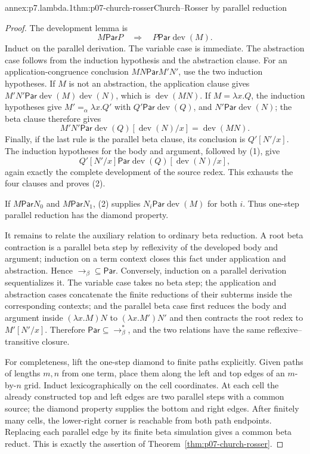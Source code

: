 \begin{annexitem}{annex:p7.lambda.1}{thm:p07-church-rosser}{Church--Rosser by parallel reduction}
\begin{proof}
The development lemma is
\[
 M\mathrel{\mathsf{Par}}P
 \quad\Longrightarrow\quad
 P\mathrel{\mathsf{Par}}\operatorname{dev}(M).          \tag{2}
\]
Induct on the parallel derivation.  The variable case is immediate.  The
abstraction case follows from the induction hypothesis and the abstraction
clause.  For an application-congruence conclusion
\(MN\mathrel{\mathsf{Par}}M'N'\), use the two induction hypotheses.  If
\(M\) is not an abstraction, the application clause gives
\(M'N'\mathrel{\mathsf{Par}}
  \operatorname{dev}(M)\operatorname{dev}(N)\), which is
\(\operatorname{dev}(MN)\).  If \(M=\lambda x.Q\), the induction hypotheses
give
\(M'=_{\alpha}\lambda x.Q'\) with
\(Q'\mathrel{\mathsf{Par}}\operatorname{dev}(Q)\), and
\(N'\mathrel{\mathsf{Par}}\operatorname{dev}(N)\); the beta clause therefore
gives
\[
 M'N'\mathrel{\mathsf{Par}}
 \operatorname{dev}(Q)[\operatorname{dev}(N)/x]
 =\operatorname{dev}(MN).
\]
Finally, if the last rule is the parallel beta clause, its conclusion is
\(Q'[N'/x]\).  The induction hypotheses for the body and argument, followed
by (1), give
\[
 Q'[N'/x]\mathrel{\mathsf{Par}}
 \operatorname{dev}(Q)[\operatorname{dev}(N)/x],
\]
again exactly the complete development of the source redex.  This exhausts
the four clauses and proves (2).

If
\(M\mathrel{\mathsf{Par}}N_0\) and
\(M\mathrel{\mathsf{Par}}N_1\), (2) supplies
\(N_i\mathrel{\mathsf{Par}}\operatorname{dev}(M)\) for both \(i\).
Thus one-step parallel reduction has the diamond property.

It remains to relate the auxiliary relation to ordinary beta reduction.  A
root beta contraction is a parallel beta step by reflexivity of the developed
body and argument; induction on a term context closes this fact under
application and abstraction.  Hence
\(\longrightarrow_\beta\subseteq\mathsf{Par}\).  Conversely, induction on a
parallel derivation sequentializes it.  The variable case takes no beta step;
the application and abstraction cases concatenate the finite reductions of
their subterms inside the corresponding contexts; and the parallel beta case
first reduces the body and argument inside
\((\lambda x.M)N\) to \((\lambda x.M')N'\) and then contracts the root redex
to \(M'[N'/x]\).  Therefore
\(\mathsf{Par}\subseteq\longrightarrow_\beta^{*}\), and the two relations
have the same reflexive--transitive closure.

For completeness, lift the one-step diamond to finite paths explicitly.  Given
paths of lengths \(m,n\) from one term, place them along the left and top edges
of an \(m\)-by-\(n\) grid.  Induct lexicographically on the cell coordinates.
At each cell the already constructed top and left edges are two parallel steps
with a common source; the diamond property supplies the bottom and right edges.
After finitely many cells, the lower-right corner is reachable from both path
endpoints.  Replacing each parallel edge by its finite beta simulation gives a
common beta reduct.  This is exactly the assertion of
Theorem~\ref{thm:p07-church-rosser}.
\end{proof}
\end{annexitem}

